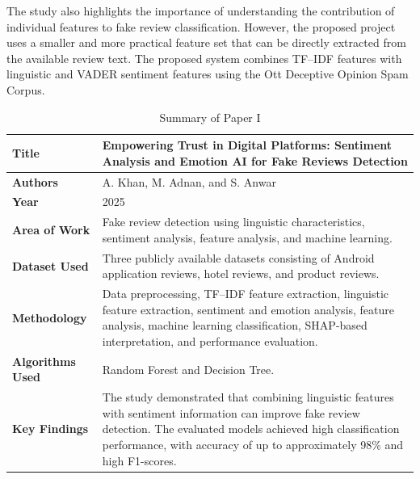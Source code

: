 \documentclass[12pt,a4paper]{report}
\begin{document}
The study also highlights the importance of understanding the contribution of individual features to fake review classification. However, the proposed project uses a smaller and more practical feature set that can be directly extracted from the available review text. The proposed system combines TF--IDF features with linguistic and VADER sentiment features using the Ott Deceptive Opinion Spam Corpus.

\begin{table}[H]
\centering
\small
\renewcommand{\arraystretch}{1.3}

\begin{tabularx}{0.95\textwidth}{|>{\raggedright\arraybackslash}p{}|X|}
\hline
\textbf{Title} &
Empowering Trust in Digital Platforms: Sentiment Analysis and Emotion AI for Fake Reviews Detection \\
\hline

\textbf{Authors} &
A. Khan, M. Adnan, and S. Anwar \\
\hline

\textbf{Year} &
2025 \\
\hline

\textbf{Area of Work} &
Fake review detection using linguistic characteristics, sentiment analysis, feature analysis, and machine learning. \\
\hline

\textbf{Dataset Used} &
Three publicly available datasets consisting of Android application reviews, hotel reviews, and product reviews. \\
\hline

\textbf{Methodology} &
Data preprocessing, TF--IDF feature extraction, linguistic feature extraction, sentiment and emotion analysis, feature analysis, machine learning classification, SHAP-based interpretation, and performance evaluation. \\
\hline

\textbf{Algorithms Used} &
Random Forest and Decision Tree. \\
\hline

\textbf{Key Findings} &
The study demonstrated that combining linguistic features with sentiment information can improve fake review detection. The evaluated models achieved high classification performance, with accuracy of up to approximately 98\% and high F1-scores. \\
\hline

\end{tabularx}

\caption{Summary of Paper I}
\label{tab:paper1}
\end{table}
\end{document}
